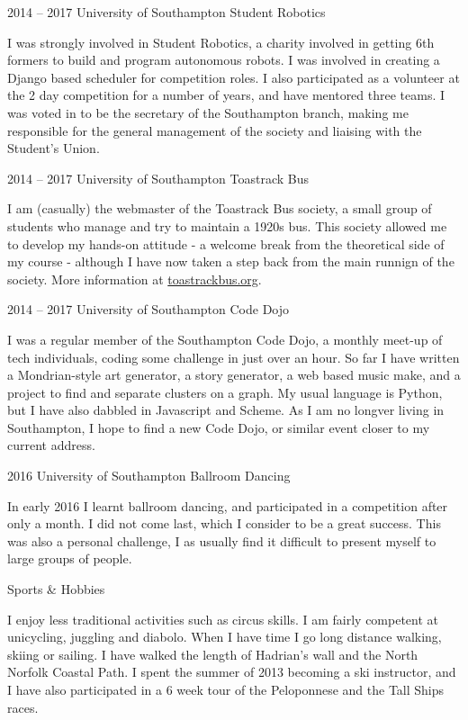 \documentclass{tccv}
\begin{document}
\begin{eventlist}

    \item{2014 -- 2017}
         {University of Southampton}
         {Student Robotics}

    I was strongly involved in Student Robotics, a charity involved in getting 6th formers to build and program autonomous robots. I was involved in creating a Django based scheduler for competition roles. I also participated as a volunteer at the 2 day competition for a number of years, and have mentored three teams. I was voted in to be the secretary of the Southampton branch, making me responsible for the general management of the society and liaising with the Student's Union.

    \item{2014 -- 2017}
         {University of Southampton}
         {Toastrack Bus}

    I am (casually) the webmaster of the Toastrack Bus society, a small group of students who manage and try to maintain a 1920s bus. This society allowed me to develop my hands-on attitude - a welcome break from the theoretical side of my course - although I have now taken a step back from the main runnign of the society. More information at \href{http://toastrackbus.org}{toastrackbus.org}.

    \item{2014 -- 2017}
         {University of Southampton}
         {Code Dojo}

    I was a regular member of the Southampton Code Dojo, a monthly meet-up of tech individuals, coding some challenge in just over an hour. So far I have written a Mondrian-style art generator, a story generator, a web based music make, and a project to find and separate clusters on a graph. My usual language is Python, but I have also dabbled in Javascript and Scheme. As I am no longver living in Southampton, I hope to find a new Code Dojo, or similar event closer to my current address.

    \item{2016}
         {University of Southampton}
         {Ballroom Dancing}

    In early 2016 I learnt ballroom dancing, and participated in a competition after only a month. I did not come last, which I consider to be a great success. This was also a personal challenge, I as usually find it difficult to present myself to large groups of people.\newline\newline

    \item{}
         {}
         {Sports \& Hobbies}

    I enjoy less traditional activities such as circus skills. I am fairly competent at unicycling, juggling and diabolo. When I have time I go long distance walking, skiing or sailing. I have walked the length of Hadrian's wall and the North Norfolk Coastal Path. I spent the summer of 2013 becoming a ski instructor, and I have also participated in a 6 week tour of the Peloponnese and the Tall Ships races.

\end{eventlist}
\end{document}
